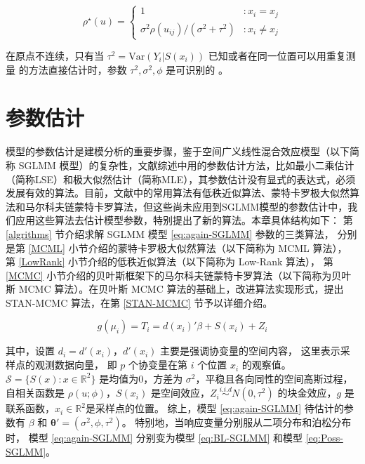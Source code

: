 \documentclass[12pt,a4paper,UTF8,twoside]{book}
\theoremstyle{definition}
\theoremstyle{definition}
\theoremstyle{definition}
\theoremstyle{remark}
\begin{document}
\begin{equation}
\rho^{\star}(u) =
\begin{cases}
                                     1 & : x_{i} = x_{j}  \\
\sigma^2\rho(u_{ij})/(\sigma^2+\tau^2) & : x_{i} \neq x_{j}
\end{cases} \label{eq:corr-nugget-function}
\end{equation}

\noindent 在原点不连续，只有当 \(\tau^2 = \mathrm{Var}(Y_i|S(x_i))\)
已知或者在同一位置可以用重复测量 的方法直接估计时，参数
\(\tau^2, \sigma^2, \phi\) 是可识别的
\citep{Diggle2002Childhood, Diggle2007}。

\hypertarget{algorithms}{%
\chapter{参数估计}\label{algorithms}}

模型的参数估计是建模分析的重要步骤，鉴于空间广义线性混合效应模型（以下简称
SGLMM
模型）的复杂性，文献综述中用的参数估计方法，比如最小二乘估计（简称LSE）和极大似然估计（简称MLE），其参数估计没有显式的表达式，必须发展有效的算法。目前，文献中的常用算法有低秩近似算法、蒙特卡罗极大似然算法和马尔科夫链蒙特卡罗算法，但这些尚未应用到SGLMM模型的参数估计中，我们应用这些算法去估计模型参数，特别提出了新的算法。本章具体结构如下：
第 \ref{algrithms} 节介绍求解 SGLMM 模型 \eqref{eq:again-SGLMM}
参数的三类算法， 分别是第 \ref{MCML}
小节介绍的蒙特卡罗极大似然算法（以下简称为 MCML 算法）， 第
\ref{LowRank} 小节介绍的低秩近似算法（以下简称为 Low-Rank 算法）， 第
\ref{MCMC}
小节介绍的贝叶斯框架下的马尔科夫链蒙特卡罗算法（以下简称为贝叶斯 MCMC
算法）。在贝叶斯 MCMC 算法的基础上，改进算法实现形式，提出 STAN-MCMC
算法，在第 \ref{STAN-MCMC} 节予以详细介绍。

\begin{equation}
g(\mu_i) =T_{i} =d(x_i)'\beta + S(x_i) + Z_i \label{eq:again-SGLMM}
\end{equation}

\noindent 其中，设置 \(d_{i} = d'(x_i)\)，\(d'(x_i)\)
主要是强调协变量的空间内容， 这里表示采样点的观测数据向量， 即 \(p\)
个协变量在第 \(i\) 个位置 \(x_i\) 的观察值。
\(\mathcal{S} = \{S(x): x \in \mathbb{R}^2\}\) 是均值为0，方差为
\(\sigma^2\)，平稳且各向同性的空间高斯过程，自相关函数是
\(\rho(u;\phi)\)，\(S(x_i)\)
是空间效应，\(Z_i \stackrel{i.i.d}{\sim} N(0,\tau^2)\) 的块金效应，\(g\)
是联系函数，\(x_i \in \mathbb{R}^2\)是采样点的位置。 综上，模型
\eqref{eq:again-SGLMM} 待估计的参数有 \(\beta\) 和
\(\boldsymbol{\theta}' = (\sigma^2,\phi,\tau^2)\)。
特别地，当响应变量分别服从二项分布和泊松分布时， 模型
\eqref{eq:again-SGLMM} 分别变为模型 \eqref{eq:BL-SGLMM} 和模型
\eqref{eq:Poss-SGLMM}。
\end{document}
